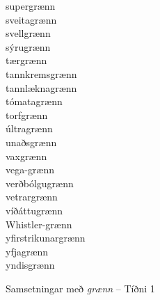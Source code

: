 \documentclass[../samsetningasafn.tex]{subfiles}
\begin{document}
\begin{bigwordlist}
\begin{footnotesize}
\begin{multicols}{4}
\begin{description}
		\item [supergrænn]
		\item [sveitagrænn]
		\item [svellgrænn]
		\item [sýrugrænn]
		\item [tærgrænn]
		\item [tannkremsgrænn]
		\item [tannlæknagrænn]
		\item [tómatagrænn]
		\item [torfgrænn]
		\item [últragrænn]
		\item [unaðsgrænn]
		\item [vaxgrænn]
		\item [vega-grænn]
		\item [verðbólgugrænn]
		\item [vetrargrænn]
		\item [víðáttugrænn]
		\item [Whistler-grænn]
		\item [yfirstrikunargrænn]
		\item [yfjagrænn]
		\item [yndisgrænn]

	\end{description}
\end{multicols}
\end{footnotesize}

\label{listi:graen1}
\caption{Samsetningar með \textit{grænn} -- Tíðni 1}
\end{bigwordlist}
\end{document}
